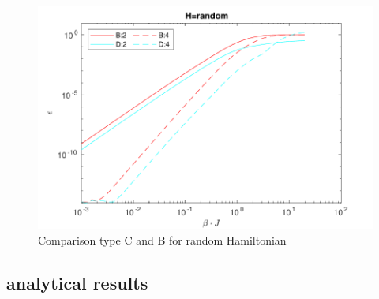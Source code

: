 \begin{figure}[H]
    \center
    \includegraphics[width=\textwidth]{Figuren/benchmarking/type5/ranodm.pdf}
    \caption{Comparison type C and B for random Hamiltonian}
\end{figure}


\subsection{analytical results}